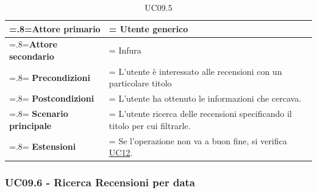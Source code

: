            \begin{table}[H]
                \centering
                \renewcommand{\arraystretch}{1.8}
                \renewcommand\tabularxcolumn[1]{m{#1}}
                \begin{tabularx}{0.9\textwidth} {
                    >{\hsize=.8\hsize\linewidth=\hsize}X
                    >{\hsize=1.2\hsize\linewidth=\hsize}X}
                    \hline
                    \textbf{Attore primario} & Utente generico \\
                    \hline
                    \textbf{Attore secondario} & Infura \\
                    \hline
                    \textbf{Precondizioni} & L'utente è interessato alle recensioni con un particolare titolo \\
                    \hline
                    \textbf{Postcondizioni} & L'utente ha ottenuto le informazioni che cercava. \\
                    \hline
                    \textbf{Scenario principale} & L'utente ricerca delle recensioni specificando il titolo per cui filtrarle.\\
                    \hline
                    \textbf{Estensioni} & Se l'operazione non va a buon fine, si verifica \hyperref[UC12]{UC12}. \\
                    \hline
                \end{tabularx}
                \caption{UC09.5}
            \end{table}

        \subsubsection{UC09.6 - Ricerca Recensioni per data}
        \label{UC09.6}

